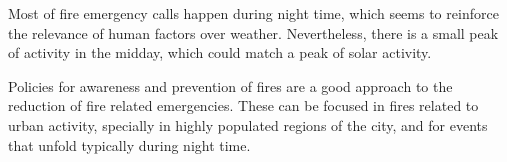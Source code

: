 \documentclass[12pt,a4paper]{article}
\begin{document}
Most of fire emergency calls happen during night time, which seems to reinforce the relevance of human factors over weather. Nevertheless, there is a small peak of activity in the midday, which could match a peak of solar activity.

Policies for awareness and prevention of fires are a good approach to the reduction of fire related emergencies. These can be focused in fires related to urban activity, specially in highly populated regions of the city, and for events that unfold typically during night time.






%

\end{document}
